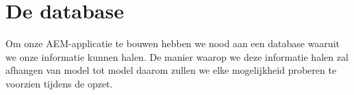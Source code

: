 \documentclass{article}
\begin{document}
	\section{De database}
	Om onze AEM-applicatie te bouwen hebben we nood aan een database waaruit we onze informatie kunnen halen.
	De manier waarop we deze informatie halen zal afhangen van model tot model daarom zullen we elke mogelijkheid
	proberen te voorzien tijdens de opzet.
\end{document}
